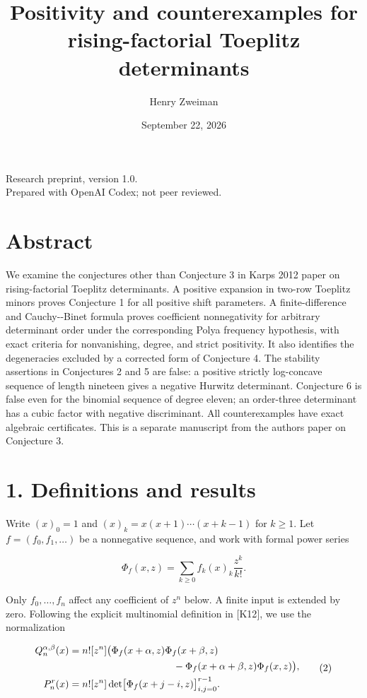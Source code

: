 \documentclass[11pt]{article}
\title{Positivity and counterexamples for rising-factorial Toeplitz determinants}
\author{Henry Zweiman}
\date{September 22, 2026}
\begin{document}
\maketitle
\begin{center}\small Research preprint, version 1.0.\\
Prepared with OpenAI Codex; not peer reviewed.\end{center}
\section{Abstract}\label{abstract}

We examine the conjectures other than Conjecture 3 in
Karp\textquotesingle s 2012 paper on rising-factorial Toeplitz
determinants. A positive expansion in two-row Toeplitz minors proves
Conjecture 1 for all positive shift parameters. A finite-difference and
Cauchy-\/-Binet formula proves coefficient nonnegativity for arbitrary
determinant order under the corresponding Polya frequency hypothesis,
with exact criteria for nonvanishing, degree, and strict positivity. It
also identifies the degeneracies excluded by a corrected form of
Conjecture 4. The stability assertions in Conjectures 2 and 5 are false:
a positive strictly log-concave sequence of length nineteen gives a
negative Hurwitz determinant. Conjecture 6 is false even for the
binomial sequence of degree eleven; an order-three determinant has a
cubic factor with negative discriminant. All counterexamples have exact
algebraic certificates. This is a separate manuscript from the
author\textquotesingle s paper on Conjecture 3.

\section{1. Definitions and results}\label{definitions-and-results}

Write \((x)_0=1\) and \((x)_k=x(x+1)\cdots(x+k-1)\) for \(k\ge1\). Let
\(f=(f_0,f_1,\ldots)\) be a nonnegative sequence, and work with formal
power series

\[
\Phi_f(x,z)=\sum_{k\ge0} f_k(x)_k\frac{z^k}{k!}.
\tag{1}
\]

Only \(f_0,\ldots,f_n\) affect any coefficient of \(z^n\) below. A
finite input is extended by zero. Following the explicit multinomial
definition in {[}K12{]}, we use the normalization

\[
\begin{aligned}
Q_n^{\alpha,\beta}(x)
&=n![z^n]\bigl(\Phi_f(x+\alpha,z)\Phi_f(x+\beta,z)\\
&\hspace{37mm}-\Phi_f(x+\alpha+\beta,z)\Phi_f(x,z)\bigr),\\
P_n^r(x)&=n![z^n]\det\bigl[\Phi_f(x+j-i,z)\bigr]_{i,j=0}^{r-1}.
\end{aligned}
\tag{2}
\]
\end{document}

